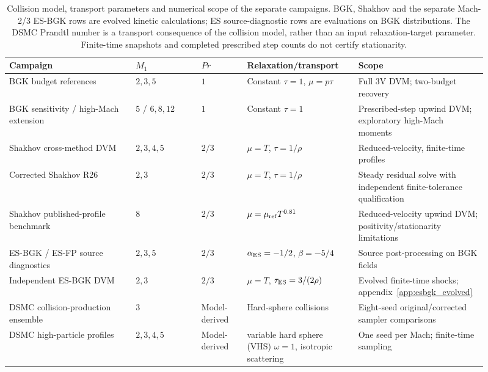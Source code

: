 \documentclass[lineno,paper]{JFM-FLM_Au}
\newcommand{\revisionbox}[1]{\colorbox{revisionyellow}{#1}}
\newcommand{\revisionbox}[1]{#1}
\begin{document}
\begin{table}
\centering
\revisionbox{\begin{minipage}{0.90\linewidth}\captionsetup{width=\linewidth}\caption{Collision model, transport parameters and numerical scope of the separate campaigns. BGK, Shakhov and the separate Mach-2/3 ES-BGK rows are evolved kinetic calculations; ES source-diagnostic rows are evaluations on BGK distributions. The DSMC Prandtl number is a transport consequence of the collision model, rather than an input relaxation-target parameter. Finite-time snapshots and completed prescribed step counts do not certify stationarity.}
\label{tab:solver_campaigns}\end{minipage}}\par
\small\raggedright\setlength{\tabcolsep}{3pt}
\begin{tabular}{p{0.25\linewidth}p{0.13\linewidth}p{0.09\linewidth}p{0.22\linewidth}p{0.22\linewidth}}
\toprule
Campaign & $M_1$ & $Pr$ & Relaxation/transport & Scope\\
\midrule
BGK budget references & $2,3,5$ & $1$ & Constant $\tau=1$, $\mu=p\tau$ & Full 3V DVM; two-budget recovery\\
BGK sensitivity / high-Mach extension & $5$ / $6,8,12$ & $1$ & Constant $\tau=1$ & Prescribed-step upwind DVM; exploratory high-Mach moments\\
Shakhov cross-method DVM & $2,3,4,5$ & $2/3$ & $\mu=T$, $\tau=1/\rho$ & Reduced-velocity, finite-time profiles\\
Corrected Shakhov R26 & $2,3$ & $2/3$ & $\mu=T$, $\tau=1/\rho$ & Steady residual solve with independent finite-tolerance qualification\\
Shakhov published-profile benchmark & $8$ & $2/3$ & $\mu=\mu_{\rm ref}T^{0.81}$ & Reduced-velocity upwind DVM; positivity/stationarity limitations\\
ES-BGK / ES-FP source diagnostics & $2,3,5$ & $2/3$ & $\alpha_{\rm ES}=-1/2$, $\beta=-5/4$ & Source post-processing on BGK fields\\
Independent ES-BGK DVM & $2,3$ & $2/3$ & $\mu=T$, $\tau_{\rm ES}=3/(2\rho)$ & Evolved finite-time shocks; appendix~\ref{app:esbgk_evolved}\\
DSMC collision-production ensemble & $3$ & Model-derived & Hard-sphere collisions & Eight-seed original/corrected sampler comparisons\\
DSMC high-particle profiles & $2,3,4,5$ & Model-derived & variable hard sphere (VHS) $\omega=1$, isotropic scattering & One seed per Mach; finite-time sampling\\
\bottomrule
\end{tabular}\par
\end{table}
\end{document}
